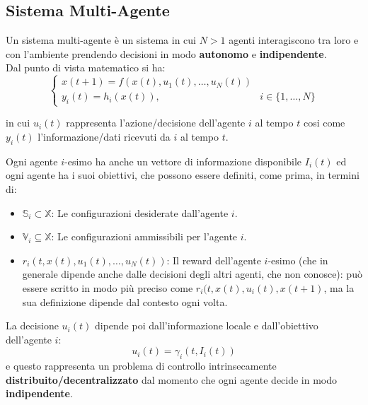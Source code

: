 \subsection{Sistema Multi-Agente}
Un sistema multi-agente \`e un sistema in cui $N>1$ agenti interagiscono tra loro e con l'ambiente prendendo decisioni in modo \textbf{autonomo} e \textbf{indipendente}.\\
Dal punto di vista matematico si ha:
\begin{equation}
\label{eqn:mag}
    \begin{cases}
    x(t+1) = f(x(t), u_1(t), \dots, u_N(t)) \\
    y_i(t) = h_i(x(t)), & i \in \{1, \dots, N \}
\end{cases}
\end{equation}

in cui $u_i(t)$ rappresenta l'azione/decisione dell'agente $i$ al tempo $t$ cosi come $y_i(t)$ l'informazione/dati ricevuti da $i$ al tempo $t$.

Ogni agente $i$-esimo ha anche un vettore di informazione disponibile $I_i(t)$ ed ogni agente ha i suoi obiettivi, che possono essere definiti, come prima, in termini di:
\begin{itemize}
\item $\mathbb{S}_i \subset \mathbb{X}$: Le configurazioni desiderate dall'agente $i$.
\item $\mathbb{V}_i \subseteq \mathbb{X}$: Le configurazioni ammissibili per l'agente $i$.
\item $r_i(t, x(t), u_1(t), \dots, u_N(t))$: Il reward dell'agente $i$-esimo (che in generale dipende anche dalle decisioni degli altri agenti, che non conosce): pu\`o essere scritto in modo pi\`u preciso come $r_i(t, x(t), u_i(t), x(t+1)$, ma la sua definizione dipende dal contesto ogni volta.
\end{itemize}
La decisione $u_i(t)$ dipende poi dall'informazione locale e dall'obiettivo dell'agente $i$:
\begin{equation}
    u_i(t) = \gamma_i(t, I_i(t))
\end{equation}
e questo rappresenta un problema di controllo intrinsecamente \textbf{distribuito/decentralizzato} dal momento che ogni agente decide in modo \textbf{indipendente}.

